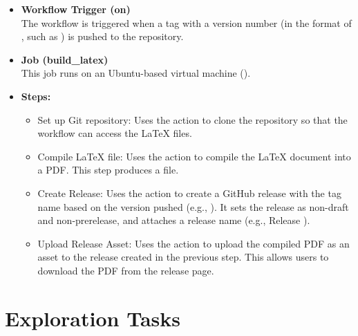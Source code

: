 \documentclass[titlepage]{article}
\begin{document}
\begin{itemize}
\item \textbf{Workflow Trigger (on)}
\\ The workflow is triggered when a tag with a version number (in the format of , such as ) is pushed to the repository.
\item \textbf{Job (build\_latex)}
\\ This job runs on an Ubuntu-based virtual machine ().
\item \textbf{Steps:}
\begin{itemize}
\item Set up Git repository: Uses the  action to clone the repository so that the workflow can access the \LaTeX \hspace{0pt} files.
\item Compile \LaTeX \hspace{0pt} file: Uses the  action to compile the \LaTeX \hspace{0pt} document  into a PDF. This step produces a  file.
\item Create Release: Uses the  action to create a GitHub release with the tag name based on the version pushed (e.g., ). It sets the release as non-draft and non-prerelease, and attaches a release name (e.g., Release ).
\item Upload Release Asset: Uses the  action to upload the compiled PDF  as an asset to the release created in the previous step. This allows users to download the PDF from the release page.
\end{itemize}
\end{itemize}

\section{Exploration Tasks}
\end{document}
